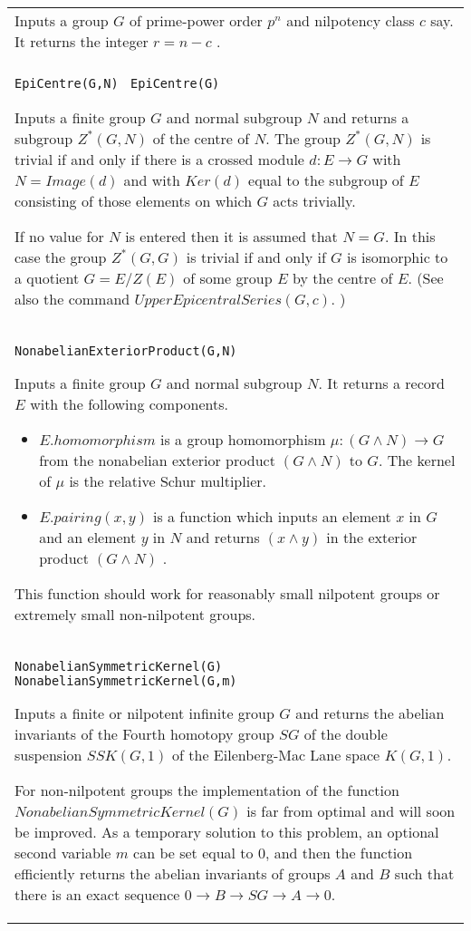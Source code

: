 \documentclass[a4paper,11pt]{report}
\begin{document}
{\begin{center}
\begin{tabular}{|l|}
 Inputs a group $G$ of prime-power order $p^n$ and nilpotency class $c$ say. It returns the integer $r=n-c$ . \\
 \index{EpiCentre} \texttt{EpiCentre(G,N) } \texttt{EpiCentre(G)} 

 Inputs a finite group $G$ and normal subgroup $N$ and returns a subgroup $Z^\ast(G,N)$ of the centre of $N$. The group $Z^\ast(G,N)$ is trivial if and only if there is a crossed module $d:E \longrightarrow G$ with $N=Image(d)$ and with $Ker(d)$ equal to the subgroup of $E$ consisting of those elements on which $G$ acts trivially. 

 If no value for $N$ is entered then it is assumed that $N=G$. In this case the group $Z^\ast(G,G)$ is trivial if and only if $G$ is isomorphic to a quotient $G=E/Z(E)$ of some group $E$ by the centre of $E$. (See also the command $UpperEpicentralSeries(G,c)$. ) \\
 \index{NonabelianExteriorProduct} \texttt{NonabelianExteriorProduct(G,N) } 

 Inputs a finite group $G$ and normal subgroup $N$. It returns a record $E$ with the following components. 
\begin{itemize}
\item  $E.homomorphism$ is a group homomorphism ${\ensuremath{\mu}} : (G \wedge N) \longrightarrow G$ from the nonabelian exterior product $(G \wedge N)$ to $G$. The kernel of ${\ensuremath{\mu}}$ is the relative Schur multiplier. 
\item  $E.pairing(x,y)$ is a function which inputs an element $x$ in $G$ and an element $y$ in $N$ and returns $(x \wedge y)$ in the exterior product $(G \wedge N)$ . 
\end{itemize}
 This function should work for reasonably small nilpotent groups or extremely
small non-nilpotent groups. \\
 \index{NonabelianSymmetricKernel} \texttt{NonabelianSymmetricKernel(G) } \texttt{NonabelianSymmetricKernel(G,m) } 

 Inputs a finite or nilpotent infinite group $G$ and returns the abelian invariants of the Fourth homotopy group $SG$ of the double suspension $SSK(G,1)$ of the Eilenberg-Mac Lane space $K(G,1)$. 

 For non-nilpotent groups the implementation of the function $NonabelianSymmetricKernel(G)$ is far from optimal and will soon be improved. As a temporary solution to this
problem, an optional second variable $m$ can be set equal to $0$, and then the function efficiently returns the abelian invariants of groups $A$ and $B$ such that there is an exact sequence $0 \longrightarrow B \longrightarrow SG \longrightarrow A \longrightarrow 0$. 


\end{tabular}
\end{center}}
\end{document}
